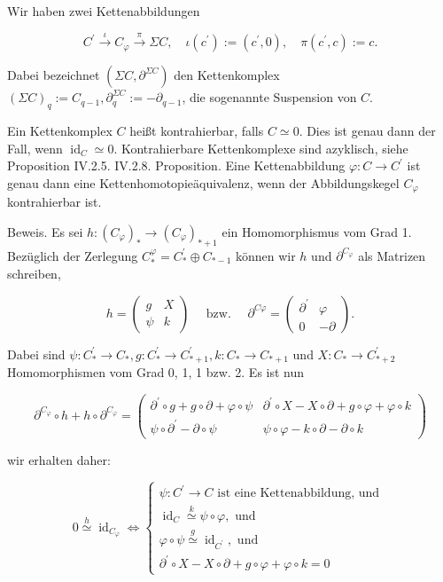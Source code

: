 \documentclass[10pt, letterpaper]{article}
\begin{document}
Wir haben zwei Kettenabbildungen

$$
C^{\prime} \xrightarrow{\iota} C_{\varphi} \xrightarrow{\pi} \Sigma C, \quad \iota\left(c^{\prime}\right):=\left(c^{\prime}, 0\right), \quad \pi\left(c^{\prime}, c\right):=c .
$$


Dabei bezeichnet $\left(\Sigma C, \partial^{\Sigma C}\right)$ den Kettenkomplex $(\Sigma C)_q:=C_{q-1}, \partial_q^{\Sigma C}:=-\partial_{q-1}$, die sogenannte Suspension von $C$.

Ein Kettenkomplex $C$ heißt kontrahierbar, falls $C \simeq 0$. Dies ist genau dann der Fall, wenn $\operatorname{id}_C \simeq 0$. Kontrahierbare Kettenkomplexe sind azyklisch, siehe Proposition IV.2.5.
IV.2.8. Proposition. Eine Kettenabbildung $\varphi: C \rightarrow C^{\prime}$ ist genau dann eine Kettenhomotopieäquivalenz, wenn der Abbildungskegel $C_{\varphi}$ kontrahierbar ist.

Beweis. Es sei $h:\left(C_{\varphi}\right)_* \rightarrow\left(C_{\varphi}\right)_{*+1}$ ein Homomorphismus vom Grad 1. Bezüglich der Zerlegung $C_*^{\varphi}=C_*^{\prime} \oplus C_{*-1}$ können wir $h$ und $\partial^{C_{\varphi}}$ als Matrizen schreiben,

$$
h=\left(\begin{array}{cc}
g & X \\
\psi & k
\end{array}\right) \quad \text { bzw. } \quad \partial^{C \varphi}=\left(\begin{array}{cc}
\partial^{\prime} & \varphi \\
0 & -\partial
\end{array}\right) .
$$

Dabei sind $\psi: C_*^{\prime} \rightarrow C_*, g: C_*^{\prime} \rightarrow C_{*+1}^{\prime}, k: C_* \rightarrow C_{*+1}$ und $X: C_* \rightarrow C_{*+2}^{\prime}$ Homomorphismen vom Grad 0, 1, 1 bzw. 2. Es ist nun

$$
\partial^{C_{\varphi}} \circ h+h \circ \partial^{C_{\varphi}}=\left(\begin{array}{cc}
\partial^{\prime} \circ g+g \circ \partial+\varphi \circ \psi & \partial^{\prime} \circ X-X \circ \partial+g \circ \varphi+\varphi \circ k \\
\psi \circ \partial^{\prime}-\partial \circ \psi & \psi \circ \varphi-k \circ \partial-\partial \circ k
\end{array}\right)
$$

wir erhalten daher:

$$
0 \stackrel{h}{\simeq} \operatorname{id}_{C_{\varphi}} \Longleftrightarrow\left\{\begin{array}{l}
\psi: C^{\prime} \rightarrow C \text { ist eine Kettenabbildung, und } \\
\operatorname{id}_C \stackrel{k}{\simeq} \psi \circ \varphi, \text { und } \\
\varphi \circ \psi \stackrel{g}{\simeq} \operatorname{id}_{C^{\prime}}, \text { und } \\
\partial^{\prime} \circ X-X \circ \partial+g \circ \varphi+\varphi \circ k=0
\end{array}\right.
$$
\end{document}
